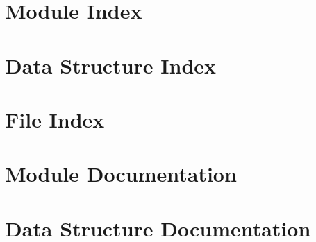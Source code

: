 \documentclass[twoside]{book}
\newcommand{\+}{\discretionary{\mbox{\scriptsize$\hookleftarrow$}}{}{}}
\begin{document}
\chapter{Module Index}

\chapter{Data Structure Index}

\chapter{File Index}

\chapter{Module Documentation}

\chapter{Data Structure Documentation}


























\end{document}
